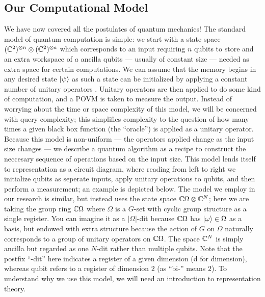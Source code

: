 \documentclass[12pt,twoside]{reedthesis}
\theoremstyle{plain}   %
\theoremstyle{definition}
\theoremstyle{remark}
\numberwithin{equation}{section}
\begin{document}
  \subsection{Our Computational Model}
  We have now covered all the postulates of quantum mechanics! The standard model of quantum computation is simple: we start with a state space $(\mathbb{C}^{2})^{\otimes n} \otimes (\mathbb{C}^{2})^{\otimes a}$ which corresponds
  to an input requiring $n$ qubits to store and an extra workspace of $a$ ancilla qubits --- usually of constant size --- needed as extra space for certain computations.
  We can assume that the memory begins in any desired state $\ket{\psi}$ as such a state can be initialized by applying a constant number of unitary operators .
  Unitary operators are then applied to do some kind of computation, and a POVM is taken to measure the output.
  Instead of worrying about the time or space complexity of this model, we will be concerned with query complexity; this simplifies complexity to the question of how many times a given black box function
  (the ``oracle'') is applied as a unitary operator.
  Because this model is non-uniform --- the operators applied change as the input size changes --- we describe a quantum algorithm as a recipe to construct the neccesary sequence of operations
  based on the input size. This model lends itself to representation as a circuit diagram, where reading from left to right we initialize qubits as seperate inputs, apply unitary operations
  to qubits, and then perform a measurement; an example is depicted below.
  The model we employ in our research is similar, but instead uses the state space $\mathbb{C}\Omega \otimes \mathbb{C}^N$; here we are taking the group ring $\mathbb{C} \Omega$ where $\Omega$ is a $G$-set with cyclic group structure
  as a single register. You can imagine it as a $|\Omega|$-dit because $\mathbb{C}\Omega$ has $\ket{\omega} \in \Omega$ as a basis, but endowed with extra structure because the action of $G$ on $\Omega$ naturally corresponds
  to a group of unitary operators on $\mathbb{C}\Omega$. The space $\mathbb{C}^N$ is simply ancilla but regarded as one $N$-dit rather than multiple qubits. Note that the postfix ``-dit'' here indicates a register of a given dimension
  (d for dimension),
  whereas qubit refers to a register of dimension $2$ (as ``bi-'' means $2$).
  To understand why we use this model, we will need an introduction to representation theory.
\end{document}
